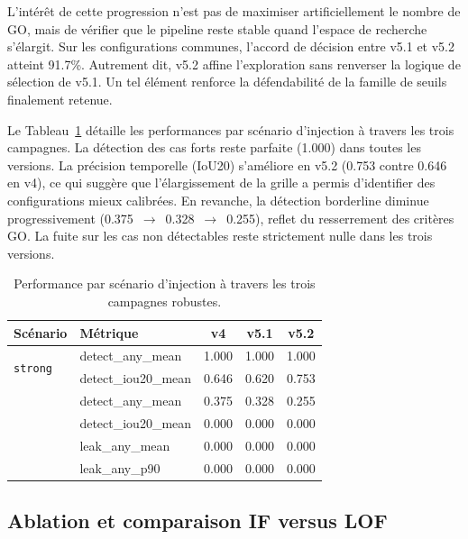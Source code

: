 L'intérêt de cette progression n'est pas de maximiser artificiellement le nombre de GO, mais
de vérifier que le pipeline reste stable quand l'espace de recherche s'élargit. Sur les
configurations communes, l'accord de décision entre v5.1 et v5.2 atteint 91.7\%.
Autrement dit, v5.2 affine l'exploration sans renverser la logique de sélection de v5.1.
Un tel élément renforce la défendabilité de la famille de seuils finalement retenue.

Le Tableau~\ref{tab:scenario_comparison} détaille les performances par scénario d'injection
à travers les trois campagnes. La détection des cas forts reste parfaite (1.000) dans
toutes les versions. La précision temporelle (IoU20) s'améliore en v5.2 (0.753 contre
0.646 en v4), ce qui suggère que l'élargissement de la grille a permis d'identifier des
configurations mieux calibrées. En revanche, la détection borderline diminue
progressivement (0.375~$\rightarrow$~0.328~$\rightarrow$~0.255), reflet du resserrement
des critères GO. La fuite sur les cas non détectables reste strictement nulle dans les
trois versions.

\begin{table}[H]
    \centering
    \caption{Performance par scénario d'injection à travers les trois campagnes robustes.}
    \label{tab:scenario_comparison}
    \small
    \begin{tabular}{llccc}
        \toprule
        \textbf{Scénario} & \textbf{Métrique} & \textbf{v4} & \textbf{v5.1} & \textbf{v5.2} \\
        \midrule
        \multirow{2}{*}{\texttt{strong}}
            & detect\_any\_mean  & 1.000 & 1.000 & 1.000 \\
            & detect\_iou20\_mean & 0.646 & 0.620 & 0.753 \\
        \addlinespace
        \multirow{2}{*}{\texttt{borderline}}
            & detect\_any\_mean  & 0.375 & 0.328 & 0.255 \\
            & detect\_iou20\_mean & 0.000 & 0.000 & 0.000 \\
        \addlinespace
        \multirow{2}{*}{\texttt{hidden}}
            & leak\_any\_mean    & 0.000 & 0.000 & 0.000 \\
            & leak\_any\_p90     & 0.000 & 0.000 & 0.000 \\
        \bottomrule
    \end{tabular}
\end{table}

\FloatBarrier
\subsection{Ablation et comparaison IF versus LOF}

